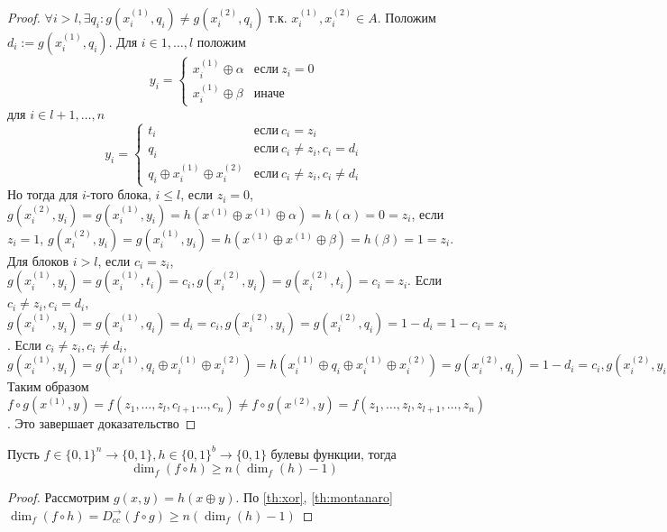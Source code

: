 \documentclass{article}
\begin{document}
\begin{theorem}
\begin{proof}
    $\forall i > l, \exists q_i: g(x^{(1)}_i, q_i) \neq g(x^{(2)}_i, q_i)$ т.к. $x^{(1)}_{i}, x^{(2)}_i \in A$.
    Положим $d_i := g(x^{(1)}_i, q_i)$. Для $i \in 1, \ldots, l$ положим 
    $$
    y_i = \begin{cases}x^{(1)}_i\oplus \alpha &\textit{если}\ z_i = 0\\x^{(1)}_i\oplus \beta&\textit{иначе} \end{cases}$$
    для $i \in l + 1, \ldots, n$
    $$    
    y_i = \begin{cases}t_i&\textit{если}\ c_i = z_i\\q_i&\textit{если}\ c_i \neq z_i, c_i = d_i\\q_i \oplus x^{(1)}_i \oplus x^{(2)}_i &\textit{если}\ c_i \neq z_i, c_i \neq d_i\end{cases}$$  
    Но тогда для $i$-того блока, $i \leq l$, если $z_i = 0$, $g(x^{(2)}_i, y_i) = g(x^{(1)}_i, y_i) = h(x^{(1)} \oplus x^{(1)} \oplus \alpha) = h(\alpha) = 0 = z_i$, если $z_i = 1$, $g(x^{(2)}_i, y_i) = g(x^{(1)}_i, y_i) = h(x^{(1)} \oplus x^{(1)} \oplus \beta) = h(\beta) = 1 = z_i$.
    Для блоков $i > l$, если $c_i = z_i$, $g(x^{(1)}_i, y_i) = g(x^{(1)}_i, t_i) = c_i, g(x^{(2)}_i, y_i) = g(x^{(2)}_i, t_i) = c_i = z_i$. Если $c_i \neq z_i, c_i = d_i$, $g(x^{(1)}_i, y_i) = g(x^{(1)}_i, q_i) = d_i = c_i, g(x^{(2)}_i, y_i) = g(x^{(2)}_i, q_i) = 1 - d_i = 1 - c_i = z_i$. Если $c_i \neq z_i, c_i \neq d_i,$ $g(x^{(1)}_i, y_i) = g(x^{(1)}_i, q_i \oplus x^{(1)}_i \oplus x^{(2)}_i) = h(x^{(1)}_i \oplus q_i \oplus x^{(1)}_i \oplus x^{(2)}_i) = g(x^{(2)}_i, q_i) = 1 - d_i = c_i, g(x^{(2)}_i, y_i) = g(x^{(2)}_i, q_i \oplus x^{(1)}_i \oplus x^{(2)}_i) = g(x^{(1)}_i, q_i) = d_i = 1 - c_i = z_i$\\     
    Таким образом $f \circ g(x^{(1)}, y) = f(z_1, \ldots, z_l, c_{l+1}  \ldots, c_n) \neq f \circ g(x^{(2)}, y) = f(z_1, \ldots, z_l, z_{l+1}, \ldots, z_n)$. Это завершает доказательство   
\end{proof}
\end{theorem}
\begin{corollary}
    \label{cor:xor}
    Пусть $f \in \{0, 1\}^n \to \{0, 1\}, h \in \{0, 1\}^b \to \{0, 1\}$ булевы функции, тогда $$\dim_{f}(f \circ h) \geq n(\dim_f(h) - 1)$$
    \begin{proof}
        Рассмотрим $g(x, y) = h(x \oplus y)$. По \autoref{th:xor},  \autoref{th:montanaro} $\dim_f(f \circ h) = D_{cc}^{\to}(f \circ g) \geq n(\dim_f(h) - 1) $
    \end{proof}
\end{corollary}
\end{document}
